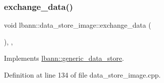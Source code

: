\subsubsection{\texorpdfstring{exchange\+\_\+data()}{exchange\_data()}}
{\footnotesize\ttfamily void lbann\+::data\+\_\+store\+\_\+image\+::exchange\+\_\+data (\begin{DoxyParamCaption}{ }\end{DoxyParamCaption})\hspace{0.3cm}{\ttfamily [override]}, {\ttfamily [protected]}, {\ttfamily [virtual]}}



Implements \hyperlink{classlbann_1_1generic__data__store_a5a34663fbbc3714d45743a6ca7195f51}{lbann\+::generic\+\_\+data\+\_\+store}.



Definition at line 134 of file data\+\_\+store\+\_\+image.\+cpp.


